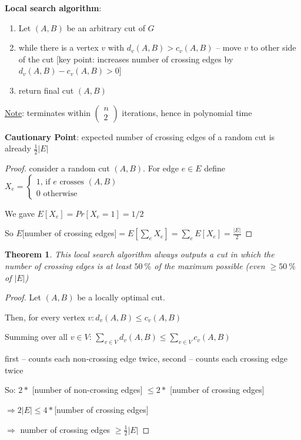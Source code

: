 \documentclass[a4paper,12pt]{article}
\theoremstyle{plain}
\newtheorem*{theorem}{Theorem}
\theoremstyle{definition}
\theoremstyle{remark}
\begin{document}
\textbf{Local search algorithm}:
\begin{enumerate}
	\item Let $(A, B)$ be an arbitrary cut of $G$
	\item while there is a vertex $v$ with $d_v(A, B) > c_v(A, B)$ -- move $v$ to other side of the cut [key point: increases number of crossing edges by $d_v(A, B) - c_v(A, B) > 0$]
	\item return final cut $(A, B)$
\end{enumerate}

\underline{Note}: terminates within $\left(\begin{aligned}n\\2\end{aligned}\right)$ iterations, hence in polynomial time

\textbf{Cautionary Point}: expected number of crossing edges of a random cut is already $\frac{1}{2} |E|$

\begin{proof}
consider a random cut $(A, B)$. For edge $e \in E$ define $X_e = \left\{\begin{aligned}1 \text{, if } e \text{ crosses } (A, B)\\0 \text{ otherwise}\end{aligned}\right.$

We gave $E[X_e] = Pr[X_e = 1] = 1/2$

So $E[$number of crossing edges$] = E[\sum\limits_{e} X_e] = \sum\limits_{e} E[X_e] = \frac{|E|}{2}$
\end{proof}

\begin{theorem}
This local search algorithm always outputs a cut in which the number of crossing edges is at least $50~\%$ of the maximum possible (even $\geq 50~\%$ of $|E|$)
\end{theorem}

\begin{proof}
Let $(A, B)$ be a locally optimal cut.

Then, for every vertex $v: d_v(A, B) \leq c_v(A, B)$

Summing over all $v \in V$: $\sum\limits_{v \in V} d_v(A, B) \leq \sum\limits_{v \in V} c_v(A, B)$

first -- counts each non-crossing edge twice, second -- counts each crossing edge twice

So: $2 *$ [number of non-crossing edges] $\leq 2 *$ [number of crossing edges]

$\Rightarrow 2|E| \leq 4 *$[number of crossing edges]

$\Rightarrow$ number of crossing edges $\geq \frac{1}{2}|E|$
\end{proof}
\end{document}
